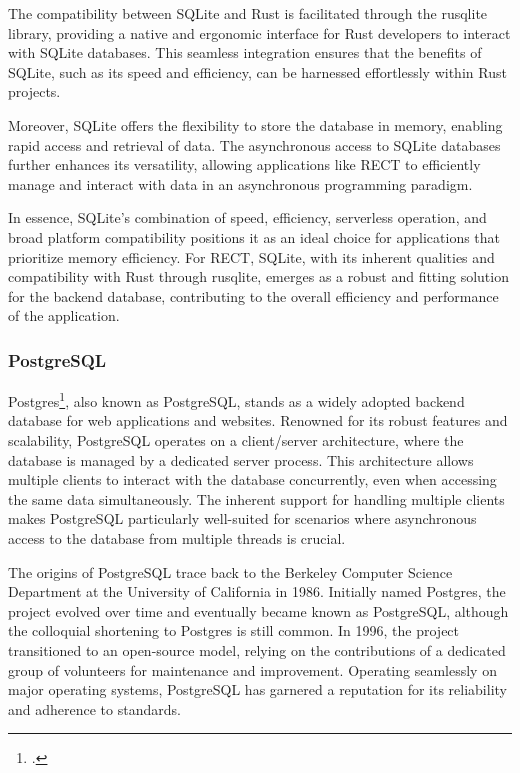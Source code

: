 The compatibility between SQLite and Rust is facilitated through the rusqlite library, providing a native and ergonomic interface for Rust developers to 
interact with SQLite databases. This seamless integration ensures that the benefits of SQLite, such as its speed and efficiency, can be harnessed effortlessly 
within Rust projects.\newline

Moreover, SQLite offers the flexibility to store the database in memory, enabling rapid access and retrieval of data. The asynchronous access to SQLite 
databases further enhances its versatility, allowing applications like RECT to efficiently manage and interact with data in an asynchronous programming paradigm.\newline

In essence, SQLite's combination of speed, efficiency, serverless operation, and broad platform compatibility positions it as an ideal choice for applications 
that prioritize memory efficiency. For RECT, SQLite, with its inherent qualities and compatibility with Rust through rusqlite, emerges as a robust and fitting 
solution for the backend database, contributing to the overall efficiency and performance of the application.

\subsubsection{PostgreSQL}
Postgres\footcite{postgres}, also known as PostgreSQL, stands as a widely adopted backend database for web applications and websites. Renowned for its robust 
features and scalability, PostgreSQL operates on a client/server architecture, where the database is managed by a dedicated server process. This architecture 
allows multiple clients to interact with the database concurrently, even when accessing the same data simultaneously. The inherent support for handling multiple 
clients makes PostgreSQL particularly well-suited for scenarios where asynchronous access to the database from multiple threads is crucial.\newline

The origins of PostgreSQL trace back to the Berkeley Computer Science Department at the University of California in 1986. Initially named Postgres, the project 
evolved over time and eventually became known as PostgreSQL, although the colloquial shortening to Postgres is still common. In 1996, the project transitioned 
to an open-source model, relying on the contributions of a dedicated group of volunteers for maintenance and improvement. Operating seamlessly on major 
operating systems, PostgreSQL has garnered a reputation for its reliability and adherence to standards.\newline

